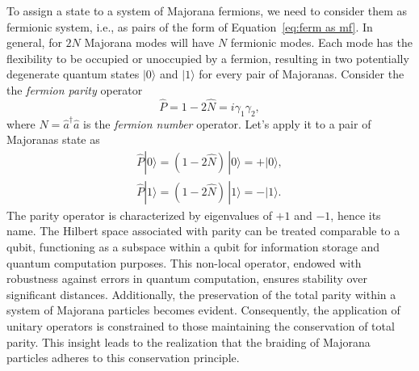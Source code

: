 \documentclass{article}
\begin{document}
To assign a state to a system of Majorana fermions, we need to consider them as fermionic system, i.e., as pairs of the form of Equation~\ref{eq:ferm as mf}. In general, for $ 2N $ Majorana modes will have $ N $ fermionic modes. Each mode has the flexibility to be occupied or unoccupied by a fermion, resulting in two potentially degenerate quantum states $ | 0 \rangle $ and $ | 1 \rangle $ for every pair of Majoranas. Consider the the \textit{fermion parity} operator
\begin{equation}
	\hat{P} = 1- 2 \hat{N} = i \gamma_1 \gamma_2,
	\label{eq:ferm parity}
\end{equation}
where $ N = \hat{a}^\dagger \hat{a} $ is the \textit{fermion number} operator. Let's apply it to a pair of Majoranas state as
$$
	\begin{aligned}
		\hat{P} |0\rangle = (1-2\hat{N})\, |0\rangle = + |0\rangle, \\
		\hat{P} |1\rangle = (1-2\hat{N})\, |1\rangle = - |1\rangle.
	\end{aligned}
$$
The parity operator is characterized by eigenvalues of $ +1 $ and $ -1 $, hence its name. The Hilbert space associated with parity can be treated comparable to a qubit, functioning as a subspace within a qubit for information storage and quantum computation purposes. This non-local operator, endowed with robustness against errors in quantum computation, ensures stability over significant distances. Additionally, the preservation of the total parity within a system of Majorana particles becomes evident. Consequently, the application of unitary operators is constrained to those maintaining the conservation of total parity. This insight leads to the realization that the braiding of Majorana particles adheres to this conservation principle.
\end{document}
